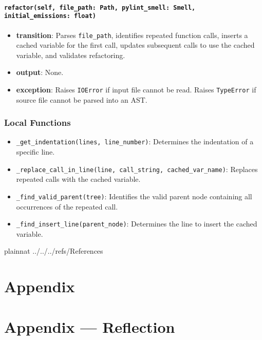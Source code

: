\documentclass[12pt, titlepage]{article}
\begin{document}
\paragraph{\texttt{refactor(self, file\_path: Path, pylint\_smell: Smell, initial\_emissions: float)}}
\begin{itemize}
  \item \textbf{transition}: Parses \texttt{file\_path}, identifies repeated function calls, inserts a cached variable for the first call, updates subsequent calls to use the cached variable, and validates refactoring.
  \item \textbf{output}: None.
  \item \textbf{exception}: Raises \texttt{IOError} if input file cannot be read. Raises \texttt{TypeError} if source file cannot be parsed into an AST.
\end{itemize}

\subsubsection{Local Functions}
\begin{itemize}
  \item \texttt{\_get\_indentation(lines, line\_number)}: Determines the indentation of a specific line.
  \item \texttt{\_replace\_call\_in\_line(line, call\_string, cached\_var\_name)}: Replaces repeated calls with the cached variable.
  \item \texttt{\_find\_valid\_parent(tree)}: Identifies the valid parent node containing all occurrences of the repeated call.
  \item \texttt{\_find\_insert\_line(parent\_node)}: Determines the line to insert the cached variable.
\end{itemize}

\newpage

 {plainnat}
 {../../../refs/References}

\newpage

\section{Appendix} \label{Appendix}


\newpage{}

\section*{Appendix --- Reflection}
\end{document}
